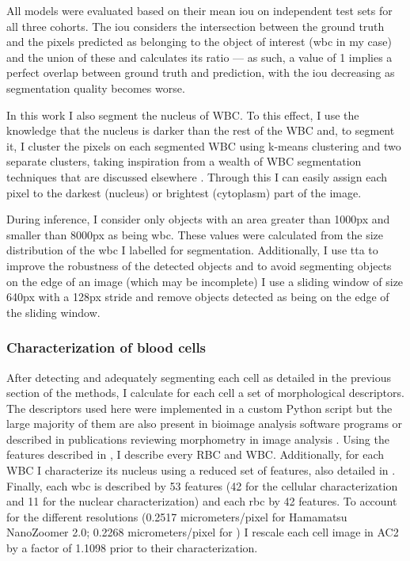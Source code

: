All models were evaluated based on their mean \ac{iou} on independent test sets for all three cohorts. The \ac{iou} considers the intersection between the ground truth and the pixels predicted as belonging to the object of interest (\ac{wbc} in my case) and the union of these and calculates its ratio --- as such, a value of 1 implies a perfect overlap between ground truth and prediction, with the \ac{iou} decreasing as segmentation quality becomes worse.

In this work I also segment the nucleus of WBC. To this effect, I use the knowledge that the nucleus is darker than the rest of the WBC and, to segment it, I cluster the pixels on each segmented WBC using k-means clustering and two separate clusters, taking inspiration from a wealth of WBC segmentation techniques that are discussed elsewhere \cite{Andrade2019-qv}. Through this I can easily assign each pixel to the darkest (nucleus) or brightest (cytoplasm) part of the image.

During inference, I consider only objects with an area greater than 1000px and smaller than 8000px as being \ac{wbc}. These values were calculated from the size distribution of the \ac{wbc} I labelled for segmentation. Additionally, I use \ac{tta} to improve the robustness of the detected objects and to avoid segmenting objects on the edge of an image (which may be incomplete) I use a sliding window of size 640px with a 128px stride and remove objects detected as being on the edge of the sliding window. 

\subsubsection{Characterization of blood cells}

After detecting and adequately segmenting each cell as detailed in the previous section of the methods, I calculate for each cell a set of morphological descriptors. The descriptors used here were implemented in a custom Python script but the large majority of them are also present in bioimage analysis software programs \cite{Carpenter2006-hy,Sommer2011-ds} or described in publications reviewing morphometry in image analysis \cite{Mingqiang2008-wv}. Using the features described in , I describe every RBC and WBC. Additionally, for each WBC I characterize its nucleus using a reduced set of features, also detailed in . Finally, each \ac{wbc} is described by 53 features (42 for the cellular characterization and 11 for the nuclear characterization) and each \ac{rbc} by 42 features. To account for the different resolutions (0.2517 micrometers/pixel for Hamamatsu NanoZoomer 2.0; 0.2268 micrometers/pixel for ) I rescale each cell image in AC2 by a factor of 1.1098 prior to their characterization.

